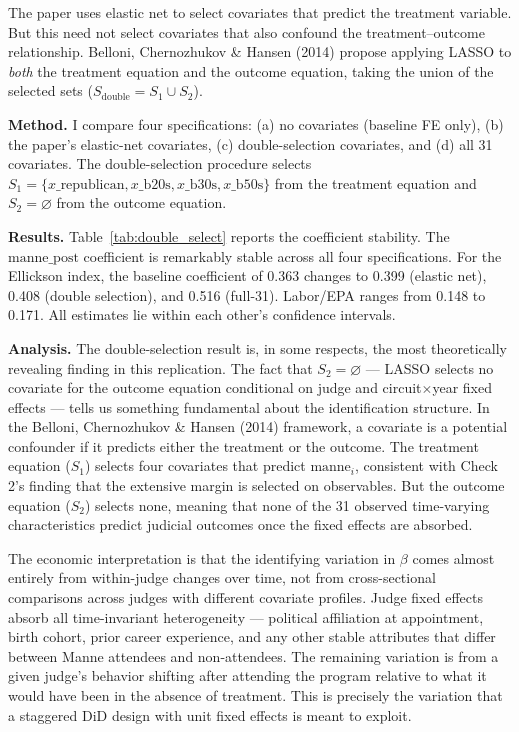 \documentclass[12pt,a4paper]{article}
\begin{document}
The paper uses elastic net to select covariates that predict the treatment variable. But this need not select covariates that also confound the treatment--outcome relationship. Belloni, Chernozhukov \& Hansen (2014) propose applying LASSO to \emph{both} the treatment equation and the outcome equation, taking the union of the selected sets ($S_{\text{double}} = S_1 \cup S_2$).

\textbf{Method.} I compare four specifications: (a) no covariates (baseline FE only), (b) the paper's elastic-net covariates, (c) double-selection covariates, and (d) all 31 covariates. The double-selection procedure selects $S_1 = \{x\_\text{republican}, x\_\text{b20s}, x\_\text{b30s}, x\_\text{b50s}\}$ from the treatment equation and $S_2 = \varnothing$ from the outcome equation.

\textbf{Results.} Table~\ref{tab:double_select} reports the coefficient stability. The $\text{manne\_post}$ coefficient is remarkably stable across all four specifications. For the Ellickson index, the baseline coefficient of 0.363 changes to 0.399 (elastic net), 0.408 (double selection), and 0.516 (full-31). Labor/EPA ranges from 0.148 to 0.171. All estimates lie within each other's confidence intervals.

\textbf{Analysis.} The double-selection result is, in some respects, the most theoretically revealing finding in this replication. The fact that $S_2 = \varnothing$ --- LASSO selects no covariate for the outcome equation conditional on judge and circuit$\times$year fixed effects --- tells us something fundamental about the identification structure. In the Belloni, Chernozhukov \& Hansen (2014) framework, a covariate is a potential confounder if it predicts either the treatment or the outcome. The treatment equation ($S_1$) selects four covariates that predict $\text{manne}_i$, consistent with Check 2's finding that the extensive margin is selected on observables. But the outcome equation ($S_2$) selects none, meaning that none of the 31 observed time-varying characteristics predict judicial outcomes once the fixed effects are absorbed.

The economic interpretation is that the identifying variation in $\beta$ comes almost entirely from within-judge changes over time, not from cross-sectional comparisons across judges with different covariate profiles. Judge fixed effects absorb all time-invariant heterogeneity --- political affiliation at appointment, birth cohort, prior career experience, and any other stable attributes that differ between Manne attendees and non-attendees. The remaining variation is from a given judge's behavior shifting after attending the program relative to what it would have been in the absence of treatment. This is precisely the variation that a staggered DiD design with unit fixed effects is meant to exploit.
\end{document}
